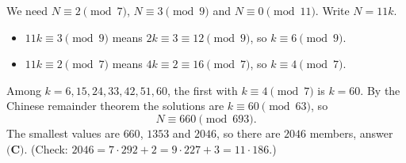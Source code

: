 We need $N\equiv2\pmod7$, $N\equiv3\pmod9$ and $N\equiv0\pmod{11}$. Write $N=11k$.
\begin{itemize}
\item $11k\equiv3\pmod9$ means $2k\equiv3\equiv12\pmod9$, so $k\equiv6\pmod9$.
\item $11k\equiv2\pmod7$ means $4k\equiv2\equiv16\pmod7$, so $k\equiv4\pmod7$.
\end{itemize}
Among $k=6,15,24,33,42,51,60$, the first with $k\equiv4\pmod7$ is $k=60$. By the Chinese remainder theorem the solutions are $k\equiv60\pmod{63}$, so
\[N\equiv660\pmod{693}.\]
The smallest values are $660$, $1353$ and $2046$, so there are $\boxed{2046}$ members, answer $\textbf{(C)}$. (Check: $2046=7\cdot292+2=9\cdot227+3=11\cdot186$.)
